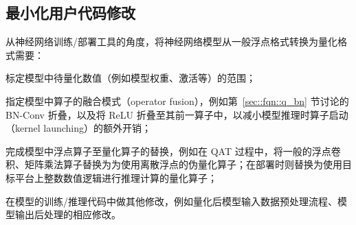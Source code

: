 \documentclass[
  fontset = source,
]{shtthesis}
\begin{document}
\subsection{最小化用户代码修改}
从神经网络训练/部署工具的角度，将神经网络模型从一般浮点格式转换为量化格式需要：
\begin{enumerate*}[a)]
  \item 标定模型中待量化数值（例如模型权重、激活等）的范围；
  \item 指定模型中算子的融合模式（operator fusion），例如第~\ref{sec::fqn::q_bn} 节讨论的 BN-Conv 折叠，以及将 ReLU 折叠至其前一算子中，以减小模型推理时算子启动（kernel launching）的额外开销；
  \item 完成模型中浮点算子至量化算子的替换，例如在 QAT 过程中，将一般的浮点卷积、矩阵乘法算子替换为为使用离散浮点的伪量化算子；在部署时则替换为使用目标平台上整数数值逻辑进行推理计算的量化算子；
  \item 在模型的训练/推理代码中做其他修改，例如量化后模型输入数据预处理流程、模型输出后处理的相应修改。
\end{enumerate*}
\end{document}

